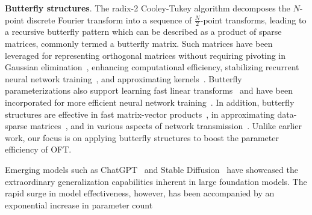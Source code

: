 \textbf{Butterfly structures}. The radix-2 Cooley-Tukey algorithm decomposes the $N$-point discrete Fourier transform into a sequence of $\frac{N}{2}$-point transforms, leading to a recursive butterfly pattern which can be described as a product of sparse matrices, commonly termed a butterfly matrix. Such matrices have been leveraged for representing orthogonal matrices without requiring pivoting in Gaussian elimination~\cite{parker1995random}, enhancing computational efficiency, stabilizing recurrent neural network training~\cite{jing2017tunable}, and approximating kernels~\cite{munkhoeva2018quadrature}. Butterfly parameterizations also support learning fast linear transforms~\cite{dao2019learning,dao2019kaleidoscope} and have been incorporated for more efficient neural network training~\cite{chen2022pixelated,dao2022monarch}. In addition, butterfly structures are effective in fast matrix-vector products~\cite{michielssen1996multilevel,o2010algorithm}, in approximating data-sparse matrices~\cite{li2015butterfly}, and in various aspects of network transmission~\cite{klasing1994broadcasting,li2003linear,rajasingh2016transmission}. Unlike earlier work, our focus is on applying butterfly structures to boost the parameter efficiency of OFT.

Emerging models such as ChatGPT~\cite{brown2020language,chen2021evaluating} and Stable Diffusion~\cite{rombach2022high} have showcased the extraordinary generalization capabilities inherent in large foundation models. The rapid surge in model effectiveness, however, has been accompanied by an exponential increase in parameter count

